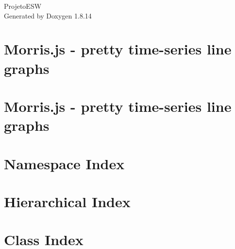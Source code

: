 \documentclass[twoside]{book}
\newcommand{\+}{\discretionary{\mbox{\scriptsize$\hookleftarrow$}}{}{}}
\newcommand{\clearemptydoublepage}{%
  \newpage{\pagestyle{empty}\cleardoublepage}%
}
\begin{document}
\hypersetup{pageanchor=false,
             bookmarksnumbered=true,
             pdfencoding=unicode
            }
\begin{titlepage}
\vspace*{7cm}
\begin{center}%
{\Large Projeto\+E\+SW }\\
\vspace*{1cm}
{\large Generated by Doxygen 1.8.14}\\
\end{center}
\end{titlepage}
\clearemptydoublepage
{}
\tableofcontents
\clearemptydoublepage
{}
\hypersetup{pageanchor=true}

\chapter{Morris.\+js -\/ pretty time-\/series line graphs}
\label{md__c_1__users_fpp_c_source_repos__projeto_e_s_w__projeto_e_s_w__projeto_e_s_w_obj__release_netcb1723da2e9bc669df8083fd4d17977f1}

\chapter{Morris.\+js -\/ pretty time-\/series line graphs}
\label{md__c_1__users_fpp_c_source_repos__projeto_e_s_w__projeto_e_s_w__projeto_e_s_w_wwwroot_plugins_morrisjs__r_e_a_d_m_e}

\chapter{Namespace Index}

\chapter{Hierarchical Index}

\chapter{Class Index}

\end{document}
